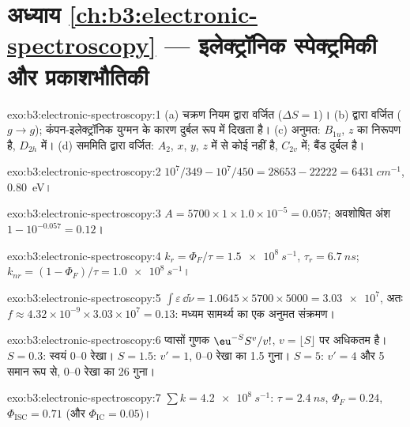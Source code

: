 \section*{अध्याय \ref{ch:b3:electronic-spectroscopy} --- इलेक्ट्रॉनिक स्पेक्ट्रमिकी और प्रकाशभौतिकी}

\begin{solution}{exo:b3:electronic-spectroscopy:1}
(a) चक्रण नियम द्वारा वर्जित ($\Delta S = 1$)। (b)  द्वारा वर्जित
($g \to g$); कंपन-इलेक्ट्रॉनिक युग्मन के कारण दुर्बल रूप में दिखता है। (c) अनुमत: $B_{1u}$,
$z$ का निरूपण है, $D_{2h}$ में। (d) सममिति द्वारा वर्जित: $A_2$, $x$,
$y$, $z$ में से कोई नहीं है, $C_{2v}$ में; बैंड दुर्बल है।
\end{solution}

\begin{solution}{exo:b3:electronic-spectroscopy:2}
$10^7/349 - 10^7/450 = 28653 - 22222 = \qty{6431}{cm^{-1}}$, \qty{0.80}{eV}।
\end{solution}

\begin{solution}{exo:b3:electronic-spectroscopy:3}
$A = 5700 \times 1 \times 1.0\times10^{-5} = 0.057$; अवशोषित अंश $1 - 10^{-0.057} =
0.12$।
\end{solution}

\begin{solution}{exo:b3:electronic-spectroscopy:4}
$k_r = \Phi_F/\tau = \qty{1.5e8}{s^{-1}}$, $\tau_r = \qty{6.7}{ns}$; $k_{nr} = (1 - \Phi_F)/\tau
= \qty{1.0e8}{s^{-1}}$।
\end{solution}

\begin{solution}{exo:b3:electronic-spectroscopy:5}
$\int\varepsilon\,\dd\tilde\nu = 1.0645 \times 5700 \times 5000 = \num{3.03e7}$, अतः $f \approx
4.32\times10^{-9} \times 3.03\times10^7 = 0.13$: मध्यम सामर्थ्य का एक अनुमत
संक्रमण।
\end{solution}

\begin{solution}{exo:b3:electronic-spectroscopy:6}
प्वासों गुणक $\eu^{-S}S^v/v!$, $v = \lfloor S\rfloor$ पर अधिकतम है। $S = 0.3$: स्वयं
0--0 रेखा। $S = 1.5$: $v' = 1$, 0--0 रेखा का 1.5 गुना। $S = 5$: $v' = 4$
और 5 समान रूप से, 0--0 रेखा का 26 गुना।
\end{solution}

\begin{solution}{exo:b3:electronic-spectroscopy:7}
$\sum k = \qty{4.2e8}{s^{-1}}$: $\tau = \qty{2.4}{ns}$, $\Phi_F = 0.24$, $\Phi_{\mathrm{ISC}} = 0.71$
(और $\Phi_{\mathrm{IC}} = 0.05$)।
\end{solution}

